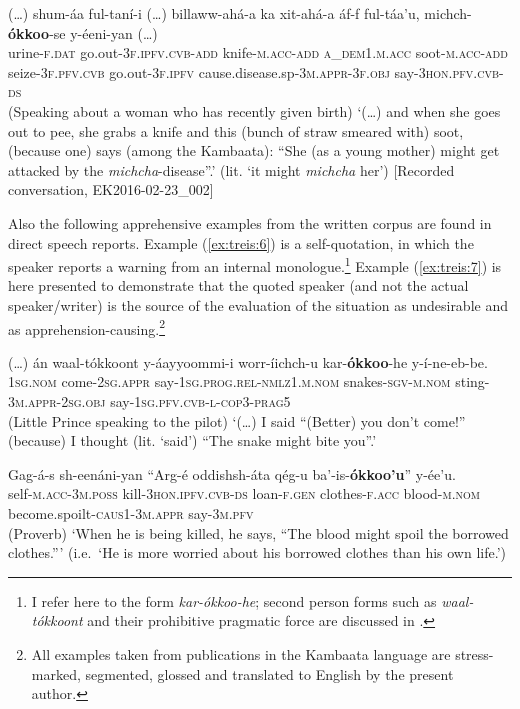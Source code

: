 \documentclass[output=paper,colorlinks,citecolor=brown,
]{langsci/langscibook}
\begin{document}
\ea\label{ex:treis:5}
\gll \textnormal{(\ldots)} 	shum-áa 		ful-taní-i \textnormal{(\ldots)}  billaww-ahá-a 		ka 					xit-ahá-a 			áf-f ful-táa'u, 			michch-\textbf{ókkoo}-se 						y-éeni-yan \textnormal{(\ldots)}\\
{} urine-\textsc{f.dat} go.out-\textsc{3f.ipfv.cvb-add} {} knife-\textsc{m.acc-add} \textsc{a\_dem1.m.acc}	soot-\textsc{m.acc-add}	seize-\textsc{3f.pfv.cvb} go.out-\textsc{3f.ipfv} cause.disease.sp-\textsc{3m.appr-3f.obj} say-\textsc{3hon.pfv.cvb-ds} \\
\glt (Speaking about a woman who has recently given birth) `(\ldots) and when she goes out to pee, she grabs a knife and this (bunch of straw smeared with) soot, (because one) says (among the Kambaata): ``She (as a young mother) might get attacked by the \textit{michcha}-disease''.'  (lit. `it might \textit{michcha} her') [Recorded conversation, EK2016-02-23\_002]
\z

Also the following apprehensive examples from the written corpus are found in direct speech reports. Example (\ref{ex:treis:6}) is a self-quotation, in which the speaker reports a warning from an internal monologue.\footnote{I refer here to the form \textit{kar-ókkoo-he}; second person forms such as \textit{waal-tókkoont} and their prohibitive pragmatic force are discussed in .} Example (\ref{ex:treis:7}) is here presented to demonstrate that the quoted speaker (and not the actual speaker\slash writer) is the source of the evaluation of the situation as undesirable and as apprehension-causing.\footnote{All examples taken from publications in the Kambaata language are stress-marked, segmented, glossed and translated to English by the present author.}

\ea\label{ex:treis:6} 
\gll \textnormal{(\ldots)} án waal-tókkoont y-áayyoommi-i worr-íichch-u kar-\textbf{ókkoo}-he y-í-ne-eb-be.\\
{} \textsc{1sg.nom}	come-\textsc{2sg.appr}	say-\textsc{1sg.prog.rel-nmlz1.m.nom} snakes-\textsc{sgv-m.nom} sting-\textsc{3m.appr-2sg.obj} say-\textsc{1sg.pfv.cvb-l-cop3-prag5}\\
\glt (Little Prince speaking to the pilot) `(\ldots) I said ``(Better) you don't come!'' (because) I thought (lit. `said') ``The snake might bite you''.' \citep[87]{Saint-Exupéry2018}
\z 

\ea\label{ex:treis:7} 
\gll Gag-á-s						sh-eenáni-yan		``Arg-é			oddishsh-áta qég-u				ba'-is-\textbf{ókkoo'u}'' 						y-ée'u. \\
self-\textsc{m.acc-3m.poss} kill-\textsc{3hon.ipfv.cvb-ds} \hphantom{[}loan-\textsc{f.gen} clothes-\textsc{f.acc}
blood-\textsc{m.nom} become.spoilt-\textsc{caus1-3m.appr} say-\textsc{3m.pfv}\\
\glt (Proverb) `When he is being killed, he says, ``The blood might spoil the borrowed clothes.''' (i.e.\ `He is more worried about his borrowed clothes than his own life.') \citep[52]{AlamuAlamaayyo2017}
\z
\end{document}
